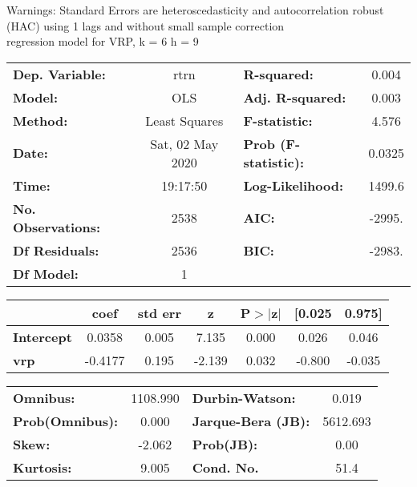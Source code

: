 Warnings: \newline
 [1] Standard Errors are heteroscedasticity and autocorrelation robust (HAC) using 1 lags and without small sample correction\\ 

regression model for VRP, k = 6 h = 9\begin{center}
\begin{tabular}{lclc}
\toprule
\textbf{Dep. Variable:}    &       rtrn       & \textbf{  R-squared:         } &     0.004   \\
\textbf{Model:}            &       OLS        & \textbf{  Adj. R-squared:    } &     0.003   \\
\textbf{Method:}           &  Least Squares   & \textbf{  F-statistic:       } &     4.576   \\
\textbf{Date:}             & Sat, 02 May 2020 & \textbf{  Prob (F-statistic):} &   0.0325    \\
\textbf{Time:}             &     19:17:50     & \textbf{  Log-Likelihood:    } &    1499.6   \\
\textbf{No. Observations:} &        2538      & \textbf{  AIC:               } &    -2995.   \\
\textbf{Df Residuals:}     &        2536      & \textbf{  BIC:               } &    -2983.   \\
\textbf{Df Model:}         &           1      & \textbf{                     } &             \\
\bottomrule
\end{tabular}
\begin{tabular}{lcccccc}
                   & \textbf{coef} & \textbf{std err} & \textbf{z} & \textbf{P$> |$z$|$} & \textbf{[0.025} & \textbf{0.975]}  \\
\midrule
\textbf{Intercept} &       0.0358  &        0.005     &     7.135  &         0.000        &        0.026    &        0.046     \\
\textbf{vrp}       &      -0.4177  &        0.195     &    -2.139  &         0.032        &       -0.800    &       -0.035     \\
\bottomrule
\end{tabular}
\begin{tabular}{lclc}
\textbf{Omnibus:}       & 1108.990 & \textbf{  Durbin-Watson:     } &    0.019  \\
\textbf{Prob(Omnibus):} &   0.000  & \textbf{  Jarque-Bera (JB):  } & 5612.693  \\
\textbf{Skew:}          &  -2.062  & \textbf{  Prob(JB):          } &     0.00  \\
\textbf{Kurtosis:}      &   9.005  & \textbf{  Cond. No.          } &     51.4  \\
\bottomrule
\end{tabular}
\end{center}

